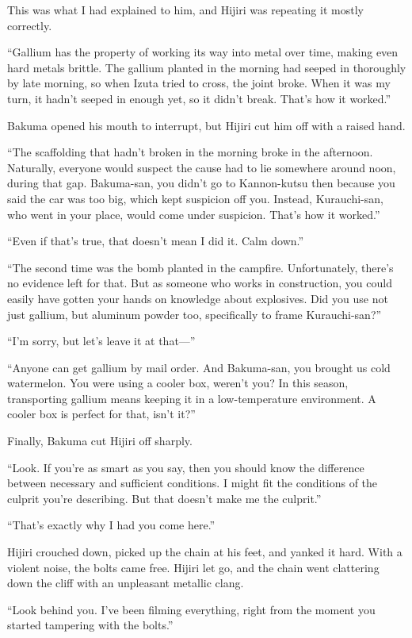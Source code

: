 \documentclass[
    a4paper,
    12pt,
    twoside,
    openany,
    UTF8,
    fontset=windows
]{ctexbook}
\begin{document}
This was what I had explained to him, and Hijiri was repeating it mostly correctly.

``Gallium has the property of working its way into metal over time, making even hard metals brittle. The gallium planted in the morning had seeped in thoroughly by late morning, so when Izuta tried to cross, the joint broke. When it was my turn, it hadn't seeped in enough yet, so it didn't break. That's how it worked.''

Bakuma opened his mouth to interrupt, but Hijiri cut him off with a raised hand.

``The scaffolding that hadn't broken in the morning broke in the afternoon. Naturally, everyone would suspect the cause had to lie somewhere around noon, during that gap. Bakuma-san, you didn't go to Kannon-kutsu then because you said the car was too big, which kept suspicion off you. Instead, Kurauchi-san, who went in your place, would come under suspicion. That's how it worked.''

``Even if that's true, that doesn't mean I did it. Calm down.''

``The second time was the bomb planted in the campfire. Unfortunately, there's no evidence left for that. But as someone who works in construction, you could easily have gotten your hands on knowledge about explosives. Did you use not just gallium, but aluminum powder too, specifically to frame Kurauchi-san?''

``I'm sorry, but let's leave it at that---''

``Anyone can get gallium by mail order. And Bakuma-san, you brought us cold watermelon. You were using a cooler box, weren't you? In this season, transporting gallium means keeping it in a low-temperature environment. A cooler box is perfect for that, isn't it?''

Finally, Bakuma cut Hijiri off sharply.

``Look. If you're as smart as you say, then you should know the difference between necessary and sufficient conditions. I might fit the conditions of the culprit you're describing. But that doesn't make me the culprit.''

``That's exactly why I had you come here.''

Hijiri crouched down, picked up the chain at his feet, and yanked it hard. With a violent noise, the bolts came free. Hijiri let go, and the chain went clattering down the cliff with an unpleasant metallic clang.

``Look behind you. I've been filming everything, right from the moment you started tampering with the bolts.''
\end{document}
